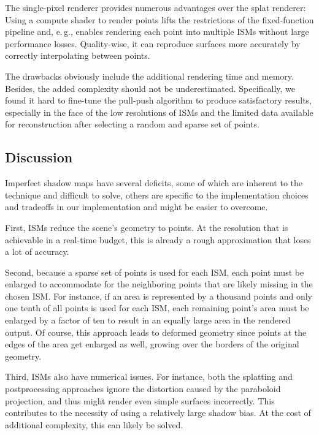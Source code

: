 The single-pixel renderer provides numerous advantages over the splat renderer: Using a compute shader to render points lifts the restrictions of the fixed-function pipeline and, e.\,g., enables rendering each point into multiple ISMs without large performance losses. Quality-wise, it can reproduce surfaces more accurately by correctly interpolating between points.

The drawbacks obviously include the additional rendering time and memory. Besides, the added complexity should not be underestimated. Specifically, we found it hard to fine-tune the pull-push algorithm to produce satisfactory results, especially in the face of the low resolutions of ISMs and the limited data available for reconstruction after selecting a random and sparse set of points.




\subsection{Discussion}
\label{sec:results:ism:discussion}

Imperfect shadow maps have several deficits, some of which are inherent to the technique and difficult to solve, others are specific to the implementation choices and tradeoffs in our implementation and might be easier to overcome.

First, ISMs reduce the scene's geometry to points. At the resolution that is achievable in a real-time budget, this is already a rough approximation that loses a lot of accuracy.

Second, because a sparse set of points is used for each ISM, each point must be enlarged to accommodate for the neighboring points that are likely missing in the chosen ISM. For instance, if an area is represented by a thousand points and only one tenth of all points is used for each ISM, each remaining point's area must be enlarged by a factor of ten to result in an equally large area in the rendered output. Of course, this approach leads to deformed geometry since points at the edges of the area get enlarged as well, growing over the borders of the original geometry.

Third, ISMs also have numerical issues. For instance, both the splatting and postprocessing approaches ignore the distortion caused by the paraboloid projection, and thus might render even simple surfaces incorrectly. This contributes to the necessity of using a relatively large shadow bias. At the cost of additional complexity, this can likely be solved.

